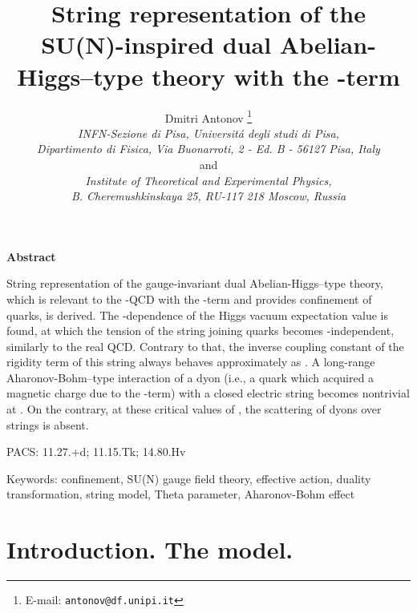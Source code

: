 \documentclass[a4paper,12pt]{article}
\title{
\vspace{-3mm}
\rightline{\small IFUP-TH 2002/27}
\vspace{8mm}
\bf String representation of the SU(N)-inspired dual Abelian-Higgs--type theory with the \myHighlight{$\Theta$}\coordHE{}-term}
\author{Dmitri Antonov
\thanks{E-mail: {\tt antonov@df.unipi.it}}
\\
{\it INFN-Sezione di Pisa, Universit\'a degli studi di Pisa,}\\
{\it Dipartimento di Fisica, Via Buonarroti, 2 - Ed. B - 56127 Pisa, Italy}\\
and\\
{\it Institute of Theoretical and Experimental Physics,}\\
{\it B. Cheremushkinskaya 25, RU-117 218 Moscow, Russia}}
\date{}
\begin{document}
\maketitle
\vspace{1mm}
\centerline{\bf {Abstract}}
\vspace{3mm}
\noindent
String representation of the \coordHE{} gauge-invariant
dual Abelian-Higgs--type theory, which is relevant to the \coordHE{}-QCD
with the \myHighlight{$\Theta$}\coordHE{}-term and provides confinement of quarks, is derived.
The \coordHE{}-dependence of the Higgs vacuum expectation value is found, at which
the tension of the string joining quarks becomes \coordHE{}-independent, similarly to the real QCD. Contrary to that,
the inverse coupling constant of the rigidity term of this string always behaves approximately as \coordHE{}.
A long-range Aharonov-Bohm--type interaction of a dyon (i.e., a quark which acquired a magnetic charge
due to the \myHighlight{$\Theta$}\coordHE{}-term) with a closed electric string becomes nontrivial at
\coordHE{}. On the contrary, at these critical values of \myHighlight{$\Theta$}\coordHE{},
the scattering of dyons over strings is absent.


\vspace{3mm}
\noindent
PACS: 11.27.+d; 11.15.Tk; 14.80.Hv

\vspace{3mm}
\noindent
Keywords: confinement, SU(N) gauge field theory, effective action, duality transformation, string model, Theta parameter,
Aharonov-Bohm effect

\newpage

\section{Introduction. The model.}
\end{document}
